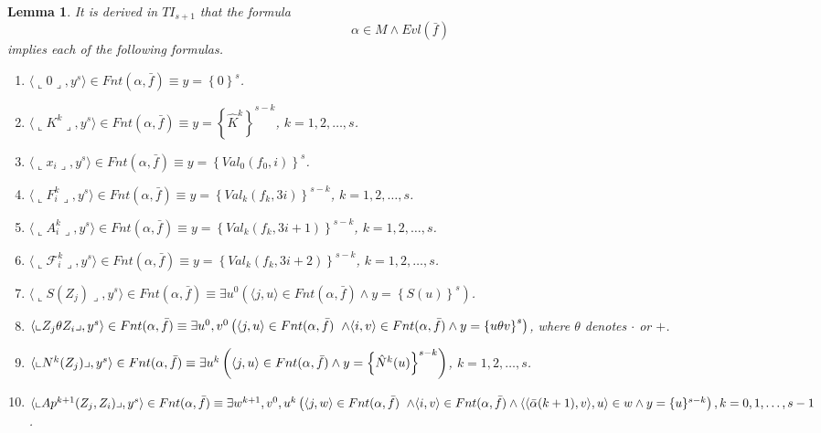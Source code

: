 \documentclass{asl}
\newtheorem{lemma}{Lemma}[section]
\theoremstyle{definition}
\begin{document}
\begin{lemma}
It is derived in $TI_{s+1}$ that the formula 
\[\alpha\in M\wedge Evl(\bar{f})\]
implies each of the following formulas.
\begin{enumerate}
\item $\langle\llcorner 0\lrcorner,y^s\rangle\in Fnt(\alpha,\bar{f})\equiv y=\left\lbrace 0 \right\rbrace^s$.
\medskip
\item $\langle\llcorner K^k\lrcorner,y^s\rangle\in Fnt(\alpha,\bar{f}) \equiv y=\left\lbrace \hat{K}^k \right\rbrace^{s-k}$, $k=1,2,\ldots,s$.
\medskip
\item
$\langle \llcorner x_i\lrcorner ,y^s\rangle\in Fnt(\alpha,\bar{f}) \equiv y=\left\lbrace Val_0(f_0,i) \right\rbrace^s$.
\medskip
\item
$\langle \llcorner F^k_i\lrcorner,y^s\rangle\in Fnt(\alpha,\bar{f}) \equiv y=\left\lbrace Val_k(f_k,3i) \right\rbrace^{s-k}$, $k=1,2,\ldots,s$.
\medskip
\item
$\langle \llcorner A^k_i\lrcorner,y^s\rangle\in Fnt(\alpha,\bar{f}) \equiv y=\left\lbrace Val_k(f_k,3i+1) \right\rbrace^{s-k}$, $k=1,2,\ldots,s$.
\medskip
\item
$\langle \llcorner \mathcal{F}^k_i\lrcorner,y^s\rangle\in Fnt(\alpha,\bar{f}) \equiv y=\left\lbrace Val_k(f_k,3i+2) \right\rbrace^{s-k}$, $k=1,2,\ldots,s$.
\medskip
\item
$\langle \llcorner S(Z_j)\lrcorner,y^s\rangle\in Fnt(\alpha,\bar{f}) \equiv 
\exists u^0\left(\langle j,u\rangle\in Fnt(\alpha,\bar{f})\wedge y=\left\lbrace S(u) \right\rbrace^s \right)$.
\medskip
\item
$\langle \llcorner Z_j\theta Z_i  \lrcorner,y^s\rangle\in Fnt(\alpha,\bar{f}) 
\equiv \exists u^0,v^0\left(\langle j,u\rangle\in Fnt(\alpha,\bar{f})
\right.
\smallskip
\\
\left.
\wedge \langle i,v\rangle\in Fnt(\alpha,\bar{f})
\wedge y=\left\lbrace u\theta v \right\rbrace^s \right)$,
where $\theta$ denotes $\cdot$ or $+$.
\medskip
\item
$\langle \llcorner N^k(Z_j)\lrcorner,y^s\rangle\in Fnt(\alpha,\bar{f}) 
\\
\equiv \exists u^k
\left(\langle j,u\rangle\in Fnt(\alpha,\bar{f})\wedge y=\left\lbrace \hat{N}^k(u) \right\rbrace^{s-k} \right)$, $k=1,2,\ldots,s$.
\medskip
\item
$\langle \llcorner Ap^{k+1}(Z_j,Z_i)\lrcorner,y^s\rangle\in Fnt(\alpha,\bar{f}) 
\equiv \exists w^{k+1}, v^0,u^{k}
\left(\langle j,w\rangle\in Fnt(\alpha,\bar{f})
\right.
\smallskip
\\
\left.
\wedge 
\langle i,v\rangle\in Fnt(\alpha,\bar{f})
\wedge
\langle\langle\bar{\alpha}(k+1),v\rangle,u\rangle\in w
\wedge y=\lbrace u\rbrace^{s-k}\right), 
\\
k=0,1,\ldots,s-1$.
\end{enumerate}
\label{lemma:frc5}
\end{lemma}
\end{document}
